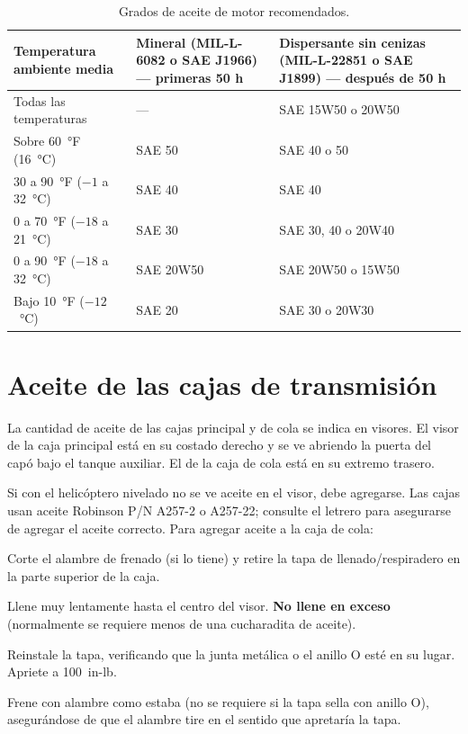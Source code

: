 \begin{table}[htbp]
\centering\small
\caption{Grados de aceite de motor recomendados.}
\label{tab:aceite-motor}
\begin{tabularx}{\linewidth}{@{}lYY@{}}
\toprule
Temperatura ambiente media & Mineral (MIL-L-6082 o SAE J1966) --- primeras 50 h & Dispersante sin cenizas (MIL-L-22851 o SAE J1899) --- después de 50 h \\
\midrule
Todas las temperaturas & --- & SAE 15W50 o 20W50 \\
Sobre 60~°F (16~°C) & SAE 50 & SAE 40 o 50 \\
30 a 90~°F ($-1$ a 32~°C) & SAE 40 & SAE 40 \\
0 a 70~°F ($-18$ a 21~°C) & SAE 30 & SAE 30, 40 o 20W40 \\
0 a 90~°F ($-18$ a 32~°C) & SAE 20W50 & SAE 20W50 o 15W50 \\
Bajo 10~°F ($-12$~°C) & SAE 20 & SAE 30 o 20W30 \\
\bottomrule
\end{tabularx}
\end{table}

\section{Aceite de las cajas de transmisión}

La cantidad de aceite de las cajas principal y de cola se indica en visores. El visor de la caja principal está en su costado derecho y se ve abriendo la puerta del capó bajo el tanque auxiliar. El de la caja de cola está en su extremo trasero.

Si con el helicóptero nivelado no se ve aceite en el visor, debe agregarse. Las cajas usan aceite Robinson P/N A257-2 o A257-22; consulte el letrero para asegurarse de agregar el aceite correcto. Para agregar aceite a la caja de cola:

\begin{pasos}
\item Corte el alambre de frenado (si lo tiene) y retire la tapa de llenado/respiradero en la parte superior de la caja.
\item Llene muy lentamente hasta el centro del visor. \textbf{No llene en exceso} (normalmente se requiere menos de una cucharadita de aceite).
\item Reinstale la tapa, verificando que la junta metálica o el anillo O esté en su lugar. Apriete a 100~in-lb.
\item Frene con alambre como estaba (no se requiere si la tapa sella con anillo O), asegurándose de que el alambre tire en el sentido que apretaría la tapa.
\end{pasos}

